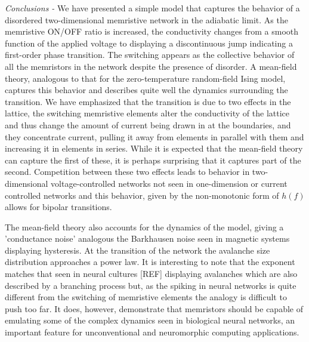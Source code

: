 \documentclass[aps,prl,reprint,groupedaddress]{revtex4-1}
\begin{document}
{\it Conclusions - } We have presented a simple model that captures the behavior of a disordered two-dimensional memristive
network in the adiabatic limit.  As the memristive ON/OFF ratio is increased,
the conductivity changes from a smooth function of the applied voltage to
displaying a discontinuous jump indicating a first-order phase transition. The switching appears as the collective behavior of all the memristors 
in the network despite the presence of disorder. 
A mean-field theory, analogous to that for the zero-temperature random-field Ising model, captures this behavior and describes quite well the dynamics
surrounding the transition.  We have emphasized that the transition is
due to two effects in the lattice, the switching memristive elements alter the
conductivity of the lattice and thus change the amount of current being drawn
in at the boundaries, and they concentrate current, pulling it away from
elements in parallel with them and increasing it in elements in series. While
it is expected that the mean-field theory can capture the first of these, it
is perhaps surprising that it captures part of the second.  Competition
between these two effects leads to behavior in two-dimensional 
voltage-controlled networks not seen in one-dimension or current controlled
networks and this behavior, given by the non-monotonic form of $h(f)$ allows
for bipolar transitions.

The mean-field theory also accounts for the dynamics of the model, giving
a 'conductance noise' analogous the Barkhausen noise seen in magnetic systems
displaying hysteresis.  At the transition of the network the avalanche
size distribution approaches a power law.  It is interesting to note that
the exponent matches that seen in neural cultures [REF] displaying avalanches which
are also described by a branching process but, as the spiking in neural
networks is quite different from the switching of memristive elements the
analogy is difficult to push too far.  It does, however, demonstrate that
memristors should be capable of emulating some of the complex dynamics seen in biological
neural networks, an important feature for unconventional and neuromorphic computing applications. 


%
\end{document}
